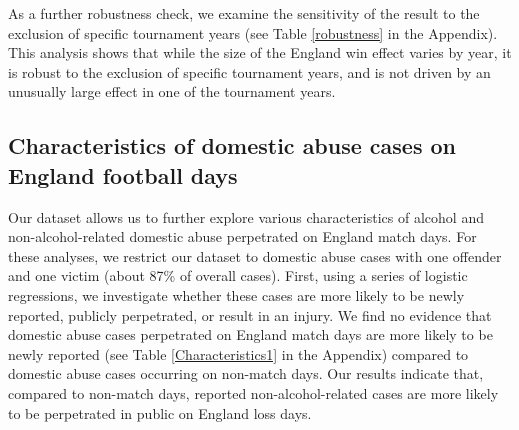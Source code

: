 \documentclass[12pt, a4paper]{article}
\begin{document}
  As a further robustness check, we examine the sensitivity of the result to the exclusion of specific tournament years  (see Table \ref{robustness} in the Appendix). This analysis shows that while the size of the England win effect varies by year, it is robust to the exclusion of specific tournament years, and is not driven by an unusually large effect in one of the tournament years.


\subsection{Characteristics of domestic abuse cases on England football days} \label{lastsection}

Our dataset allows us to further explore various characteristics of alcohol and non-alcohol-related domestic abuse perpetrated on England match days. For these analyses, we restrict our dataset to domestic abuse cases with one offender and one victim (about 87\% of overall cases). First, using a series of logistic regressions, we investigate whether these cases are more likely to be newly reported, publicly perpetrated, or result in an injury. We find no evidence that domestic abuse cases perpetrated on England match days are more likely to be newly reported (see Table \ref{Characteristics1} in the Appendix) compared to domestic abuse cases occurring on non-match days. Our results indicate that, compared to non-match days, reported non-alcohol-related cases are more likely to be perpetrated in public on England loss days. 





\end{document}
